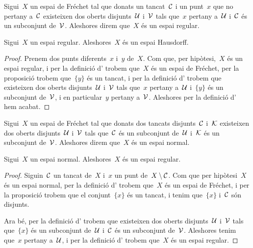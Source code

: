 \documentclass[../../main.tex]{subfiles}
\begin{document}
    \begin{definition}
        \label{def:espai regular}
        Sigui~\(X\) un espai de Fréchet tal que donats un tancat~\(\mathcal{C}\) i un punt~\(x\) que no pertany a~\(\mathcal{C}\) existeixen dos oberts disjunts~\(\mathcal{U}\) i~\(\mathcal{V}\) tals que~\(x\) pertany a~\(\mathcal{U}\) i~\(\mathcal{C}\) és un subconjunt de~\(\mathcal{V}\).
        Aleshores direm que~\(X\) és un espai regular.
    \end{definition}
    \begin{proposition}
        Sigui~\(X\) un espai regular.
        Aleshores~\(X\) és un espai Hausdorff.
        \begin{proof}
            Prenem dos punts diferents~\(x\) i~\(y\) de~\(X\).
            Com que, per hipòtesi,~\(X\) és un espai regular, i per la definició d' trobem que~\(X\) és un espai de Fréchet, per la proposició  trobem que~\(\{y\}\) és un tancat, i per la definició d' trobem que existeixen dos oberts disjunts~\(\mathcal{U}\) i~\(\mathcal{V}\) tals que~\(x\) pertany a~\(\mathcal{U}\) i~\(\{y\}\) és un subconjunt de~\(\mathcal{V}\), i en particular~\(y\) pertany a~\(\mathcal{V}\).
            Aleshores per la definició d' hem acabat.
        \end{proof}
    \end{proposition}
    \begin{definition}
        \label{def:espai normal}
        Sigui~\(X\) un espai de Fréchet tal que donats dos tancats disjunts~\(\mathcal{C}\) i~\(\mathcal{K}\) existeixen dos oberts disjunts~\(\mathcal{U}\) i~\(\mathcal{V}\) tals que~\(\mathcal{C}\) és un subconjunt de~\(\mathcal{U}\) i~\(\mathcal{K}\) és un subconjunt de~\(\mathcal{V}\).
        Aleshores direm que~\(X\) és un espai normal.
    \end{definition}
    \begin{proposition}
        \label{prop:els espais normals són espais regulars}
        Sigui~\(X\) un espai normal.
        Aleshores~\(X\) és un espai regular.
        \begin{proof}
            Siguin~\(\mathcal{C}\) un tancat de~\(X\) i~\(x\) un punt de~\(X\setminus\mathcal{C}\).
            Com que per hipòtesi~\(X\) és un espai normal, per la definició d' trobem que~\(X\) és un espai de Fréchet, i per la proposició  trobem que el conjunt~\(\{x\}\) és un tancat, i tenim que~\(\{x\}\) i~\(\mathcal{C}\) són disjunts.

            Ara bé, per la definició d' trobem que existeixen dos oberts disjunts~\(\mathcal{U}\) i~\(\mathcal{V}\) tals que~\(\{x\}\) és un subconjunt de~\(\mathcal{U}\) i~\(\mathcal{C}\) és un subconjunt de~\(\mathcal{V}\).
            Aleshores tenim que~\(x\) pertany a~\(\mathcal{U}\), i per la definició d' trobem que~\(X\) és un espai regular.
        \end{proof}
    \end{proposition}
\end{document}
